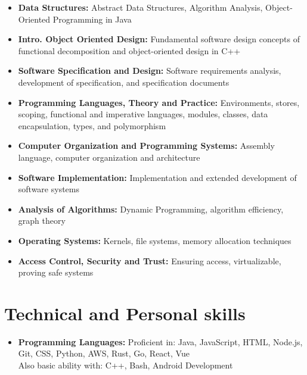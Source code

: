 \documentclass[11pt,a4paper,roman]{moderncv}        %
\begin{document}
\begin{itemize}

  \item{\textbf{Data Structures:} Abstract Data Structures, Algorithm Analysis, Object-Oriented Programming in Java}
  \item{\textbf{Intro. Object Oriented Design:} Fundamental software design concepts of functional decomposition and object-oriented design in C++}
  \item{\textbf{Software Specification and Design:} Software requirements analysis, development of specification, and specification documents}
  \item{\textbf{Programming Languages, Theory and Practice:} Environments, stores, scoping, functional and imperative languages, modules, classes, data encapsulation, types, and polymorphism}
  \item{\textbf{Computer Organization and Programming Systems:} Assembly language, computer organization and architecture}
  \item{\textbf{Software Implementation:} Implementation and extended development of software systems}
  \item{\textbf{Analysis of Algorithms:} Dynamic Programming, algorithm efficiency, graph theory}
  \item{\textbf{Operating Systems:} Kernels, file systems, memory allocation techniques}
  \item{\textbf{Access Control, Security and Trust:} Ensuring access, virtualizable, proving safe systems}

\end{itemize}

\vspace{2pt}

\section{Technical and Personal skills}

\vspace{2pt}

\begin{itemize}

\item \textbf{Programming Languages:} Proficient in: Java, JavaScript, HTML, Node.js, Git, CSS, Python, AWS, Rust, Go, React, Vue \\ Also basic ability with: C++, Bash, Android Development

\vspace{2pt}

\end{itemize}
\end{document}

